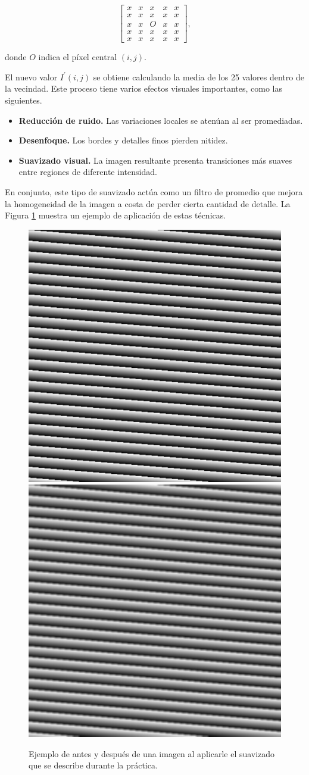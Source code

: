 \documentclass[11pt,a4paper,twoside]{article}
\theoremstyle{definition}
\begin{document}
	\begin{equation} \label{matriz}
		\begin{bmatrix}
			x & x & x & x & x \\
			x & x & x & x & x \\
			x & x & \boxed{O} & x & x \\
			x & x & x & x & x \\
			x & x & x & x & x
		\end{bmatrix},
	\end{equation}
	
	donde $O$ indica el píxel central $(i,j)$. 
	
	El nuevo valor $I^\prime(i,j)$ se obtiene calculando la media de los 25 valores dentro de la vecindad. Este proceso tiene varios efectos visuales importantes, como las siguientes.
	
	\begin{itemize}
		\item \textbf{Reducción de ruido.} Las variaciones locales se atenúan al ser promediadas.
		\item \textbf{Desenfoque.} Los bordes y detalles finos pierden nitidez.
		\item \textbf{Suavizado visual.} La imagen resultante presenta transiciones más suaves entre regiones de diferente intensidad.
	\end{itemize}
	
	En conjunto, este tipo de suavizado actúa como un filtro de promedio que mejora la homogeneidad de la imagen a costa de perder cierta cantidad de detalle. La Figura \ref{transi} muestra un ejemplo de aplicación de estas técnicas.
	
	\begin{figure} [H] \centering
		\includegraphics[width=.45\textwidth]{imagenes/entrada.pdf}
		\hspace*{0.5cm}
		\includegraphics[width=.45\textwidth]{imagenes/salida.pdf}
		\caption{Ejemplo de antes y después de una imagen al aplicarle el suavizado que se describe durante la práctica.}
		\label{transi}
	\end{figure}
	
\end{document}
